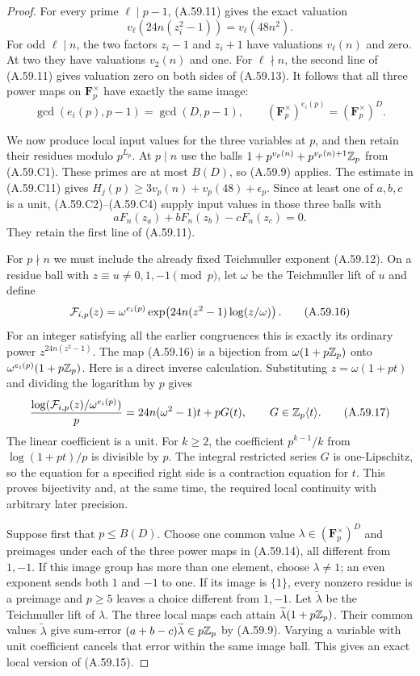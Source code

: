 \begin{proof}
For every prime $\ell\mid p-1$, (A.59.11) gives
the exact valuation
\[
 v_\ell(24n(z_i^2-1))=v_\ell(48n^2).
 \tag{A.59.13}
\]
For odd $\ell\mid n$, the two factors $z_i-1$
and $z_i+1$ have valuations $v_\ell(n)$ and zero.
At two they have valuations $v_2(n)$ and one.
For $\ell\nmid n$, the second line of (A.59.11)
gives valuation zero on both sides of (A.59.13).
It follows that all three power maps on
$\mathbf F_p^\times$ have exactly the same image:
\[
 \gcd(e_i(p),p-1)=\gcd(D,p-1),\qquad
       (\mathbf F_p^\times)^{e_i(p)}
                       =(\mathbf F_p^\times)^D.
 \tag{A.59.14}
\]

We now produce local input values for the three
variables at $p$, and then retain their residues
modulo $p^{L_p}$.
At $p\mid n$ use the balls
$1+p^{v_p(n)}+p^{v_p(n)+1}\mathbb Z_p$ from (A.59.C1).
These primes are at most $B(D)$, so (A.59.9)
applies. The estimate in (A.59.C11) gives
$H_j(p)\ge3v_p(n)+v_p(48)+\epsilon_p$.
Since at least one of $a,b,c$ is a unit,
(A.59.C2)--(A.59.C4) supply input values in those
three balls with
\[
                  aF_n(z_a)+bF_n(z_b)-cF_n(z_c)=0.
 \tag{A.59.15}
\]
They retain the first line of (A.59.11).

For $p\nmid n$ we must include the already fixed
Teichmuller exponent (A.59.12). On a residue ball
with $z\equiv u\ne0,1,-1\pmod p$, let $\omega$
be the Teichmuller lift of $u$ and define
\[
 {\cal F}_{i,p}(z)=
     \omega^{e_i(p)}
       \exp\!\left(24n(z^2-1)\log(z/\omega)\right).
 \tag{A.59.16}
\]
For an integer satisfying all the earlier
congruences this is exactly its ordinary power
$z^{24n(z^2-1)}$.
The map (A.59.16) is a bijection from
$\omega(1+p\mathbb Z_p)$ onto
$\omega^{e_i(p)}(1+p\mathbb Z_p)$.
Here is a direct inverse calculation. Substituting
$z=\omega(1+pt)$ and dividing the logarithm by $p$
gives
\[
 \frac{\log({\cal F}_{i,p}(z)/\omega^{e_i(p)})}{p}
       =24n(\omega^2-1)t+pG(t),
                 \qquad G\in\mathbb Z_p\langle t\rangle.
 \tag{A.59.17}
\]
The linear coefficient is a unit. For $k\ge2$,
the coefficient $p^{k-1}/k$ from
$\log(1+pt)/p$ is divisible by $p$.
The integral restricted series $G$ is
one-Lipschitz, so the equation for a specified
right side is a contraction equation for $t$.
This proves bijectivity and, at the same time,
the required local continuity with arbitrary
later precision.

Suppose first that $p\le B(D)$.
Choose one common value
$\lambda\in(\mathbf F_p^\times)^D$
and preimages under each of the three power
maps in (A.59.14), all different from $1,-1$.
If this image group has more than one element,
choose $\lambda\ne1$; an even exponent sends
both $1$ and $-1$ to one. If its image is
$\{1\}$, every nonzero residue is a preimage
and $p\ge5$ leaves a choice different from
$1,-1$. Let $\widetilde\lambda$ be the
Teichmuller lift of $\lambda$.
The three local maps each attain
$\widetilde\lambda(1+p\mathbb Z_p)$.
Their common values $\widetilde\lambda$ give
sum-error
$(a+b-c)\widetilde\lambda\in p\mathbb Z_p$
by (A.59.9). Varying a variable with unit
coefficient cancels that error within the
same image ball. This gives an exact local
version of (A.59.15).


\end{proof}
